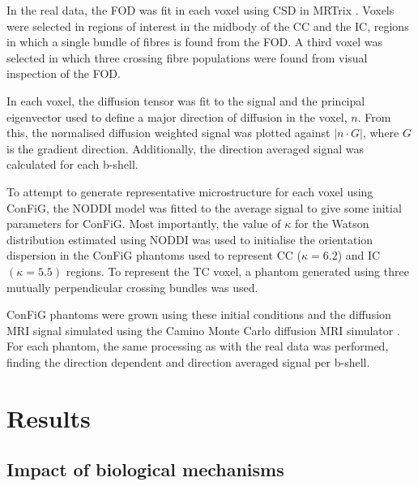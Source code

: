 In the real data, the \ac{FOD} was fit in each voxel using \ac{CSD} in MRTrix \cite{Tournier2019,Tournier2007}. Voxels were selected in regions of interest in the midbody of the \ac{CC} and the \ac{IC}, regions in which a single bundle of fibres is found from the FOD. A third voxel was selected in which three crossing fibre populations were found from visual inspection of the FOD.


In each voxel, the diffusion tensor was fit to the signal and the principal eigenvector used to define a major direction of diffusion in the voxel, $n$. From this, the normalised diffusion weighted signal was plotted against $|n\cdot G|$, where $G$ is the gradient direction. Additionally, the direction averaged signal was calculated for each b-shell.

To attempt to generate representative microstructure for each voxel using \ac{ConFiG}, the \ac{NODDI} model \cite{Zhang2012} was fitted to the average signal to give some initial parameters for \ac{ConFiG}. Most importantly, the value of $\kappa$ for the Watson distribution \cite{Mardia2008} estimated using \ac{NODDI} was used to initialise the orientation dispersion in the \ac{ConFiG} phantoms used to represent \ac{CC} ($\kappa=6.2$) and \ac{IC} $(\kappa=5.5)$ regions. To represent the \ac{TC} voxel, a phantom generated using three mutually perpendicular crossing bundles was used.

ConFiG phantoms were grown using these initial conditions and the diffusion \ac{MRI} signal simulated using the Camino Monte Carlo diffusion \ac{MRI} simulator \cite{Hall2009}. For each phantom, the same processing as with the real data was performed, finding the direction dependent and direction averaged signal per b-shell.

\section{Results}
\label{sec:config_results}

\subsection{Impact of biological mechanisms}
\label{sec:config_result_impact_of_mechanisms}

